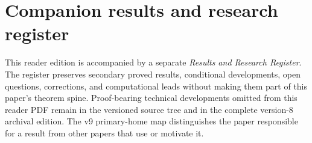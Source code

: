 \section*{Companion results and research register}

This reader edition is accompanied by a separate \emph{Results and Research
Register}.  The register preserves secondary proved results, conditional
developments, open questions, corrections, and computational leads without
making them part of this paper's theorem spine.  Proof-bearing technical
developments omitted from this reader PDF remain in the versioned source
tree and in the complete version-8 archival edition.  The v9 primary-home
map distinguishes the paper responsible for a result from other papers that
use or motivate it.
